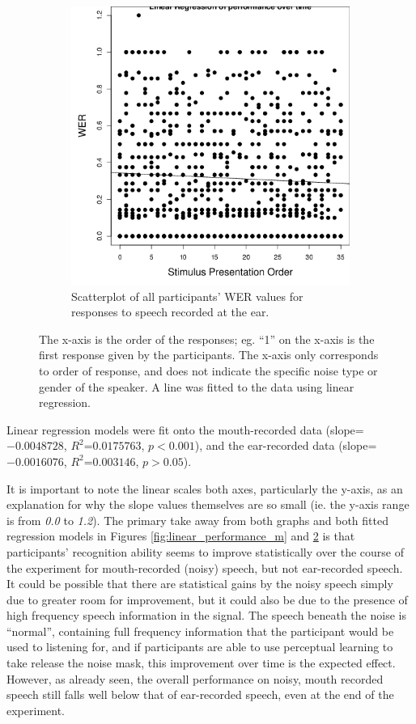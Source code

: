 \documentclass[dissertation,copyright]{uathesis}
\makeatletter
\def\maxwidth{ %
  \ifdim\Gin@nat@width>\linewidth
    \linewidth
  \else
    \Gin@nat@width
  \fi
}
\makeatother
\begin{document}
\begin{figure}[t]
\begin{subfigure}{0.47\textwidth}
\includegraphics[width=\maxwidth]{figure/line_graph_chrono-1} 

\caption{Scatterplot of all participants' WER values for responses to speech recorded at the ear.}
\label{fig:linear_performance_e}
\end{subfigure}
\caption{The x-axis is the order of the responses; eg. ``1'' on the x-axis is the first response given by the participants.  The x-axis only corresponds to order of response, and does not indicate the specific noise type or gender of the speaker.  A line was fitted to the data using linear regression.}
\end{figure}
%
Linear regression models were fit onto the mouth-recorded data (slope=$-0.0048728$, $R^2$=$0.0175763$, $p<0.001$), and the ear-recorded data (slope=$-0.0016076$, $R^2$=$0.003146$, $p>0.05$). 

It is important to note the linear scales both axes, particularly the y-axis, as an explanation for why the slope values themselves are so small (ie. the y-axis range is from \textit{0.0} to \textit{1.2}).  The primary take away from both graphs and both fitted regression models in Figures \ref{fig:linear_performance_m} and \ref{fig:linear_performance_e} is that participants' recognition ability seems to improve statistically over the course of the experiment for mouth-recorded (noisy) speech, but not ear-recorded speech.  It could be possible that there are statistical gains by the noisy speech simply due to greater room for improvement, but it could also be due to the presence of high frequency speech information in the signal. The speech beneath the noise is ``normal'', containing full frequency information that the participant would be used to listening for, and if participants are able to use perceptual learning to take release the noise mask, this improvement over time is the expected effect.  However, as already seen, the overall performance on noisy, mouth recorded speech still falls well below that of ear-recorded speech, even at the end of the experiment.
\end{document}
